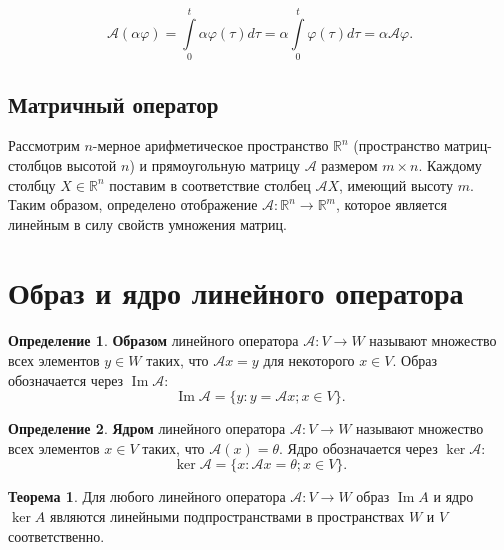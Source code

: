 \documentclass[a5paper, 11pt]{extbook}
\theoremstyle{definition}
\newtheorem{theorem}{Теорема}[section]
\theoremstyle{definition}
\newtheorem{definition}{Определение}[section]
\theoremstyle{definition}
\DeclareMathOperator{\Ima}{Im}
\begin{document}
\[
    \mathcal{A} (\alpha \varphi) =
    \int\limits_0^t \alpha \varphi(\tau) d\tau = \alpha \int\limits_0^t \varphi(\tau) d\tau = \alpha \mathcal{A} \varphi.
\]

\subsection{Матричный оператор}

Рассмотрим \(n\)-мерное арифметическое пространство \(\mathbb{R}^n\) (пространство матриц-столбцов высотой \(n\)) и прямоугольную матрицу \(\mathcal{A}\) размером \(m \times n\). Каждому столбцу \(X \in \mathbb{R}^n\) поставим в соответствие столбец \(\mathcal{A} X\), имеющий высоту \(m\). Таким образом, определено отображение \(\mathcal{A}: \mathbb{R}^n \to \mathbb{R}^m\), которое является линейным в силу свойств умножения матриц.

\section{Образ и ядро линейного оператора}

\begin{definition}
    \textbf{Образом} линейного оператора \(\mathcal{A}: V \to W\) называют множество всех элементов \(y \in W\) таких, что \(\mathcal{A} x = y\) для некоторого \(x \in V\). Образ обозначается через \(\Ima \mathcal{A}\):
    \[
        \Ima \mathcal{A} = \{y: y = \mathcal{A} x; x \in V\}.
    \]
\end{definition}

\begin{definition}
    \textbf{Ядром} линейного оператора \(\mathcal{A}: V \to W\) называют множество всех элементов \(x \in V\) таких, что \(\mathcal{A}(x) = \theta\). Ядро обозначается через \(\ker \mathcal{A}\):
    \[
        \ker \mathcal{A} = \{x: \mathcal{A} x = \theta; x \in V\}.
    \]
\end{definition}

\begin{theorem}
    Для любого линейного оператора \(\mathcal{A}: V \to W\) образ \(\Ima A\) и ядро \(\ker A\) являются линейными подпространствами в пространствах \(W\) и \(V\) соответственно.
\end{theorem}
\end{document}
